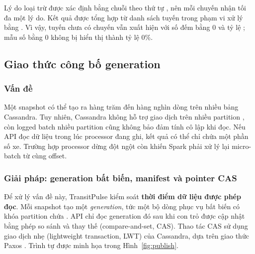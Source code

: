 Lý do loại trừ được xác định bằng chuỗi  theo thứ tự , nên mỗi chuyến nhận tối đa một lý do. Kết quả được tổng hợp từ danh sách tuyến trong phạm vi xử lý bằng . Vì vậy, tuyến chưa có chuyến vẫn xuất hiện với số đếm bằng 0 và tỷ lệ ; mẫu số bằng 0 không bị hiển thị thành tỷ lệ 0\%.

\subsection{Giao thức công bố generation}
\label{sec:publish}

\subsubsection{Vấn đề}

Một snapshot có thể tạo ra hàng trăm đến hàng nghìn dòng trên nhiều bảng Cassandra. Tuy nhiên, Cassandra không hỗ trợ giao dịch trên nhiều partition \cite{cassandra}, còn logged batch nhiều partition cũng không bảo đảm tính cô lập khi đọc. Nếu API đọc dữ liệu trong lúc processor đang ghi, kết quả có thể chỉ chứa một phần số xe. Trường hợp processor dừng đột ngột còn khiến Spark phải xử lý lại micro-batch từ cùng offset.

\subsubsection{Giải pháp: generation bất biến, manifest và pointer CAS}

Để xử lý vấn đề này, TransitPulse kiểm soát \textbf{thời điểm dữ liệu được phép đọc}. Mỗi snapshot tạo một \textit{generation}, tức một bộ dòng phục vụ bất biến có khóa partition chứa . API chỉ đọc generation đó sau khi con trỏ  được cập nhật bằng phép so sánh và thay thế (compare-and-set, CAS). Thao tác CAS sử dụng giao dịch nhẹ (lightweight transaction, LWT) của Cassandra, dựa trên giao thức Paxos \cite{paxos}. Trình tự được minh họa trong Hình~\ref{fig:publish}.

